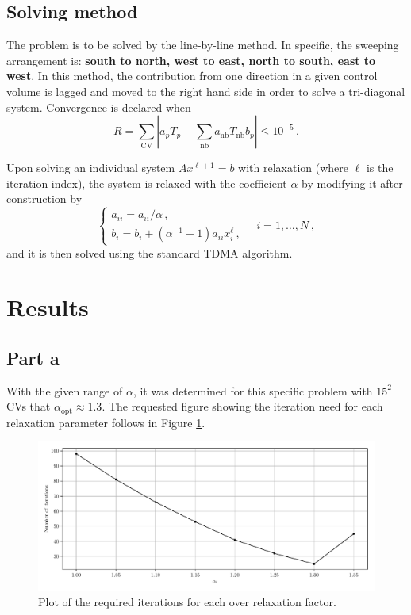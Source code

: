 \documentclass{article}
\begin{document}
\subsection*{Solving method}

The problem is to be solved by the line-by-line method. In specific, the sweeping arrangement is: \textbf{south to north, west to east, north to south, east to west}. In this method, the contribution from one direction in a given control volume is lagged and moved to the right hand side in order to solve a tri-diagonal system. Convergence is declared when
\begin{equation}
	R = \sum_\text{CV} \left| a_p T_p - \sum_{\text{nb}} a_\text{nb} T_\text{nb} b_p\right|\leq 10^{-5}\,.
\end{equation}

Upon solving an individual system $Ax^{\ell + 1} = b$ with relaxation (where $\ell$ is the iteration index), the system is relaxed with the coefficient $\alpha$ by modifying it after construction by
\[
	\begin{cases}
		a_{ii} = a_{ii} / \alpha\,,\\
		b_i = b_i + (\alpha^{-1} - 1) a_{ii} x_i^\ell\,,
	\end{cases} \quad i = 1, \ldots, N\,,
\]
and it is then solved using the standard TDMA algorithm.

\section*{Results}

\subsection*{Part a}

With the given range of $\alpha$, it was determined for this specific problem with $15^2$ CVs that $\alpha_\text{opt} \approx 1.3$. The requested figure showing the iteration need for each relaxation parameter follows in Figure \ref{fig:iterations}.

\begin{figure}[H]
	\centering
	\includegraphics[width=\linewidth]{../python/iterations}
	\caption{Plot of the required iterations for each over relaxation factor.}
	\label{fig:iterations}
\end{figure}
\end{document}
